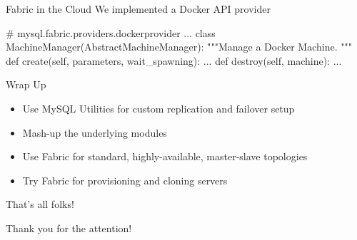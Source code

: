 \documentclass{beamer}[10]
\begin{document}
\begin{pyframe}{Fabric in the Cloud}
We implemented a Docker API provider
\begin{pycode}
# mysql.fabric.providers.dockerprovider
...
class MachineManager(AbstractMachineManager):
    """Manage a Docker Machine.
    """
    def create(self, parameters, wait_spawning):
        ...
    def destroy(self, machine):
        ...

\end{pycode}
\end{pyframe}


\begin{pyframe}{Wrap Up}
\begin{itemize}
\item Use MySQL Utilities for custom replication and failover setup
\item Mash-up the underlying modules
\item Use Fabric for standard, highly-available, master-slave topologies
\item Try Fabric for provisioning and cloning servers
\end{itemize}
\end{pyframe}

\begin{pyframe}{That's all folks!}
\begin{center}
Thank you for the attention! \\ \\
\insertauthor
\end{center}
\end{pyframe}

\end{document}
